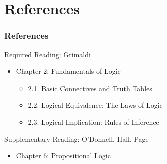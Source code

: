 \documentclass[dvipsnames]{beamer}
\begin{document}
\section*{References}

\begin{frame}
  \frametitle{References}

  \begin{block}{Required Reading: Grimaldi}
    \begin{itemize}
      \item Chapter 2: Fundamentals of Logic
      \begin{itemize}
        \item 2.1. \alert{Basic Connectives and Truth Tables}
        \item 2.2. \alert{Logical Equivalence: The Laws of Logic}\\
        \item 2.3. \alert{Logical Implication: Rules of Inference}
      \end{itemize}
    \end{itemize}
  \end{block}

  \begin{block}{Supplementary Reading: O'Donnell, Hall, Page}
    \begin{itemize}
      \item Chapter 6: Propositional Logic
    \end{itemize}
  \end{block}
\end{frame}
\end{document}
